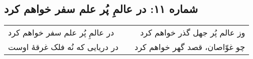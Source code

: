 \begin{center}
\section*{شماره ۱۱: در عالمِ پُر علم سفر خواهم کرد}
\label{sec:011}
\begin{longtable}{l p{0.5cm} r}
در عالمِ پُر علم سفر خواهم کرد
&&
وز عالم پُر جهل گذر خواهم کرد
\\
در دریایی که نُه فلک غرقهٔ اوست
&&
چو غوّاصان، قصد گهر خواهم کرد
\\
\end{longtable}
\end{center}
